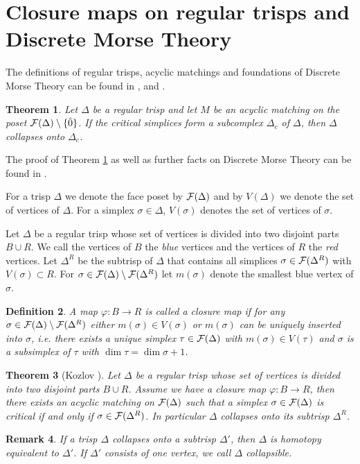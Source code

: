 \documentclass{elsarticle}
\newtheorem{df}{Definition}[section]
\newtheorem{thm}[df]{Theorem}
\newtheorem{rem}[df]{Remark}
\begin{document}
\section{Closure maps on regular trisps and Discrete Morse Theory}
The definitions of regular trisps, acyclic matchings and foundations of Discrete Morse Theory can be found in \cite{forman}, \cite{clmap} and \cite{buch}.
\begin{thm}%
\label{morsemain}
Let $\Delta$ be a regular trisp and let $M$ be an acyclic matching on the poset ${\cal F}(\Delta)\setminus\{\hat{0}\}$. If the critical simplices form a subcomplex $\Delta_c$ of $\Delta$, then $\Delta$ collapses onto $\Delta_c$.
\end{thm}
The proof of Theorem \ref{morsemain} as well as further facts on Discrete Morse Theory can be found in \cite[Chapter 11]{buch}.

For a trisp $\Delta$ we denote the face poset by ${\cal F}(\Delta)$ and by $V(\Delta)$ we denote the set of vertices of $\Delta$. For a simplex $\sigma\in\Delta$, $V(\sigma)$ denotes the set of vertices of $\sigma$.

Let $\Delta$ be a regular trisp whose set of vertices is divided into two disjoint parts $B\cup R$. We call the vertices of $B$ the \emph{blue} vertices and the vertices of $R$ the \emph{red} vertices. Let $\Delta^R$ be the subtrisp of $\Delta$ that contains all simplices $\sigma\in{\cal F}(\Delta^R)$ with $V(\sigma)\subset R$. For $\sigma\in{\cal F}(\Delta)\setminus{\cal F}(\Delta^R)$ let $m(\sigma)$ denote the smallest blue vertex of $\sigma$.
\begin{df}
A map $\varphi:B\longrightarrow R$ is called a \emph{closure map} if for any $\sigma\in{\cal F}(\Delta)\setminus{\cal F}(\Delta^R)$ either $m(\sigma)\in V(\sigma)$ or $m(\sigma)$ can be uniquely inserted into $\sigma$, i.e. there exists a unique simplex $\tau\in{\cal F}(\Delta)$ with $m(\sigma)\in V(\tau)$ and $\sigma$ is a subsimplex of $\tau$ with $\dim\tau=\dim\sigma+1$.
\end{df}
\begin{thm}[Kozlov \cite{clmap}]
\label{clthm}
Let $\Delta$ be a regular trisp whose set of vertices is divided into two disjoint parts $B\cup R$. Assume we have a closure map $\varphi:B\longrightarrow R$, then there exists an acyclic matching on ${\cal F}(\Delta)$ such that a simplex $\sigma\in{\cal F}(\Delta)$ is critical if and only if $\sigma\in{\cal F}(\Delta^R)$. In particular $\Delta$ collapses onto its subtrisp $\Delta^R$.
\end{thm}
\begin{rem}
\label{coll}
If a trisp $\Delta$ collapses onto a subtrisp $\Delta'$, then $\Delta$ is homotopy equivalent to $\Delta'$. If $\Delta'$ consists of one vertex, we call $\Delta$ \emph{collapsible}.
\end{rem}
\end{document}
